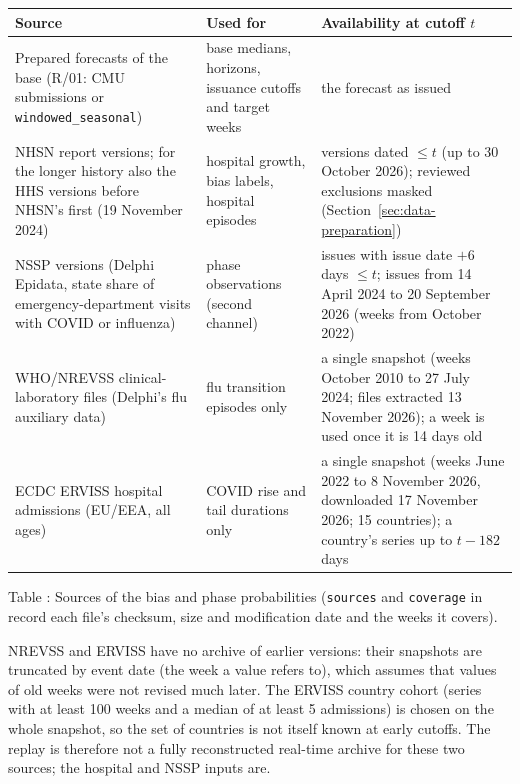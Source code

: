 \documentclass[11pt,a4paper]{article}
\theoremstyle{definition}
\theoremstyle{remark}
\begin{document}
\begin{center}
\small
\begin{tabularx}{\linewidth}{@{}p{3.3cm}p{3.8cm}X@{}}
\toprule
Source & Used for & Availability at cutoff $t$\\
\midrule
Prepared forecasts of the base (R/01: CMU submissions or
\texttt{windowed\_seasonal}) & base medians, horizons, issuance cutoffs and
target weeks & the forecast as issued\\
NHSN report versions; for the longer history also the HHS versions before
NHSN's first (19 November 2024) & hospital growth, bias labels, hospital
episodes & versions dated $\le t$ (up to 30 October 2026); reviewed exclusions
masked (Section~\ref{sec:data-preparation})\\
NSSP versions (Delphi Epidata, state share of emergency-department visits
with COVID or influenza) & phase observations (second channel) & issues
with issue date $+6$ days $\le t$; issues from 14 April 2024 to 20 September
2026 (weeks from October 2022)\\
WHO/NREVSS clinical-laboratory files (Delphi's flu auxiliary data) & flu
transition episodes only & a single snapshot (weeks October 2010 to 27 July
2024; files extracted 13 November 2026); a week is used once it is 14 days
old\\
ECDC ERVISS hospital admissions (EU/EEA, all ages) & COVID rise and tail
durations only & a single snapshot (weeks June 2022 to 8 November 2026,
downloaded 17 November 2026; 15 countries); a country's series up to $t-182$
days\\
\bottomrule
\end{tabularx}
\end{center}
\label{tab:phase-sources}
\begin{center}\small Table \thetable: Sources of the bias and phase
probabilities (\texttt{sources} and \texttt{coverage} in
 record each file's checksum, size and
modification date and the weeks it covers).
\end{center}

NREVSS and ERVISS have no archive of earlier versions: their snapshots are
truncated by event date (the week a value refers to), which assumes that
values of old weeks were not revised much later. The ERVISS country cohort
(series with at least 100 weeks and a median of at least 5 admissions) is
chosen on the whole snapshot, so the set of countries is not itself known
at early cutoffs. The replay is therefore not a fully reconstructed
real-time archive for these two sources; the hospital and NSSP inputs are.
\end{document}
